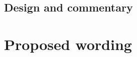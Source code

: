 \documentclass[ebook,10pt,oneside,openany,final]{memoir}
\begin{document}
\pagestyle{cpppage}



\frontmatter



\mainmatter
\setglobalstyles

\begin{KeepFromToc}
\part[Commentary]{Design and commentary}\label{commentary}






\end{KeepFromToc}

\part[Wording]{Proposed wording}\label{wording}

% 
% 
% 
% 
% 
% 
% 
% 
% 
% 
% 



%

%


\end{document}
